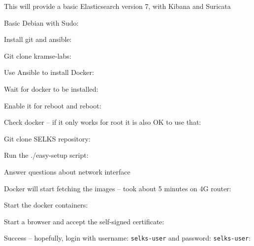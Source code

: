 \documentclass[a4paper,11pt,notitlepage,landscape]{report}
\begin{document}
This will provide a basic Elasticsearch version 7, with Kibana and Suricata

\eject

Basic Debian with Sudo:

Install git and ansible:
\eject

Git clone kramse-labs:

Use Ansible to install Docker:
\eject

Wait for docker to be installed:

Enable it for reboot and reboot:
\eject

Check docker -- if it only works for root it is also OK to use that:

Git clone SELKS repository:
\eject

Run the ./easy-setup script:

Answer questions about network interface
\eject

Docker will start fetching the images -- took about 5 minutes on 4G router:

\eject

Start the docker containers:



Start a browser and accept the self-signed certificate:

\eject

Success -- hopefully, login with username: \verb+selks-user+ and password: \verb+selks-user+:
\end{document}
